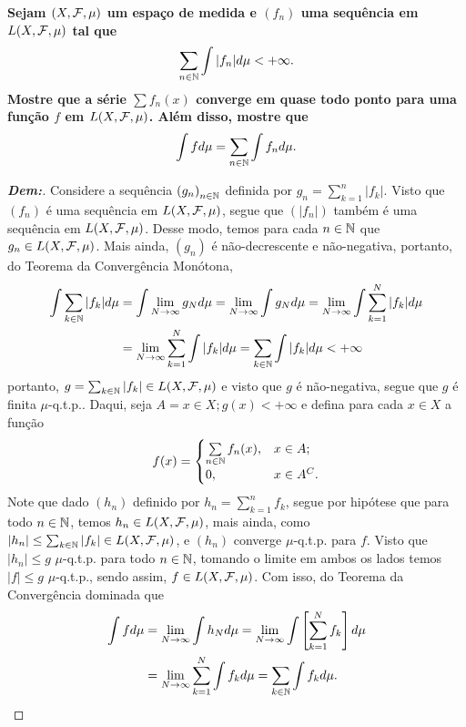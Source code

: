 \textbf{Sejam $(X, \mathcal F, \mu)$ um espaço de medida e $(f_n)$ uma sequência em 
$L(X, \mathcal F, \mu)$ tal que 
\begin{align*}
  \sum_{n \in \mathbb N} \int |f_n| d\mu < +\infty.
\end{align*}
Mostre que a série $\sum f_n(x)$ converge em quase todo ponto para uma função $f$ 
em $L(X, \mathcal F, \mu)$. Além disso, mostre que 
\begin{align*}
  \int f d\mu = \sum_{n \in \mathbb N} \int f_n d\mu.
\end{align*}}
\begin{proof}[\textbf{Dem:}] Considere a sequência $\left(g_n\right)_{n \in \mathbb N}$ definida por 
  $g_n = \sum_{k=1}^n |f_k|$. Visto que $(f_n)$ é uma sequência em $L(X,\mathcal F, \mu)$,
  segue que $(|f_n|)$ também é uma sequência em $L(X, \mathcal F, \mu)$. Desse modo, 
  temos para cada $n \in \mathbb N$ que $g_n \in L(X, \mathcal F, \mu)$. Mais ainda, $(g_n)$ 
  é não-decrescente e não-negativa, portanto, do Teorema da Convergência Monótona,
  \begin{align*}
    \int \sum_{k\in \mathbb N} |f_k| d\mu&= \int \lim_{N \rightarrow \infty} g_N d\mu 
    = \lim_{N \rightarrow \infty} \int g_N d\mu 
    = \lim_{N \rightarrow \infty} \int \sum_{k=1}^N |f_k| d\mu \\
    &= \lim_{N \rightarrow \infty} \sum_{k=1}^N \int |f_k| d\mu
    = \sum_{k\in \mathbb N} \int |f_k| d\mu < +\infty 
  \end{align*}
  portanto, $g = \sum_{k \in \mathbb N} |f_k| \in L(X, \mathcal F, \mu)$ e 
  visto que $g$ é não-negativa, segue que $g$ é finita $\mu$-q.t.p.. Daqui,
  seja $A = {x \in X; g(x)< + \infty}$ e defina para cada $x \in X$ a função  
  \begin{align*}
    f(x) = \begin{cases}
      \sum\limits_{n \in \mathbb N} f_n (x), &x \in A;\\ 
      0, & x\in A^C.
    \end{cases}
  \end{align*}
  Note que dado $(h_n)$ definido por $h_n = \sum_{k=1}^n f_k$, segue 
  por hipótese que para todo $n \in \mathbb N$, temos $h_n \in L(X, \mathcal F, \mu)$, mais ainda,
  como $|h_n| \le \sum_{k \in \mathbb N} |f_k| \in L(X, \mathcal F, \mu)$, 
  e $(h_n)$ converge $\mu$-q.t.p. para $f$. Visto que
  $|h_n| \le g$ $\mu$-q.t.p. para todo $n \in \mathbb N$, tomando o limite em ambos os lados
  temos $|f|\le g$ $\mu$-q.t.p., 
  sendo assim, $f \in L(X, \mathcal F, \mu)$.
  Com isso, do Teorema da Convergência dominada que 
  \begin{align*}
    \int f d\mu &= \lim_{N \rightarrow \infty} \int h_N d\mu 
    = \lim_{N \rightarrow \infty} \int \left[\sum_{k=1}^N f_k\right] d\mu\\
    &= \lim_{N \rightarrow \infty} \sum_{k=1}^N \int f_k d\mu 
    = \sum_{k \in \mathbb N} \int f_k d\mu.
  \end{align*}
\end{proof}

